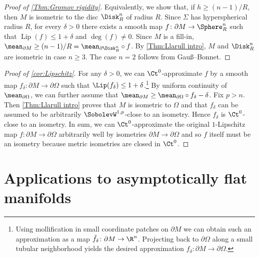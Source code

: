 \documentclass[a4paper,11pt]{amsart}
\numberwithin{equation}{section}
\begin{document}
\begin{proof}[Proof of \cref{Thm:Gromov rigidity}]
Equivalently, we show that, if $h\geq(n-1)/R$, then $M$ is isometric to the disc $\Disk_R^n$ of radius $R$.
Since $\Sigma$ has hyperspherical radius $R$, for every \(\delta > 0\) there exists a smooth map $f \colon\partial M\to\Sphere^n_R$ such that \(\operatorname{Lip}(f) \leq 1 + \delta\) and \(\deg(f) \neq 0\).
Since $M$ is a fill-in, \(\mean_{\partial M}\geq (n-1)/R=\mean_{\partial\Disk^n_R} \circ f\).
By \cref{Thm:Llarull intro}, $M$ and $\Disk^n_R$ are isometric in case $n\ge3$. The case $n=2$ follows from Gauß--Bonnet. 
\end{proof}

\begin{proof}[Proof of \cref{cor:Lipschitz}]
    For any \(\delta > 0\), we can \(\Ct^0\)-approximate \(f\) by a smooth map \(f_\delta \colon \partial M \to \partial \Omega\) such that \(\Lip(f_\delta) \leq 1 + \delta\).\footnote{Using mollification in small coordinate patches on \(\partial M\) we can obtain such an approximation as a map \(\tilde{f}_\delta \colon \partial M \to \R^n\). Projecting back to \(\partial \Omega\) along a small tubular neighborhood yields the desired approximation \(f_\delta \colon \partial M \to \partial \Omega\).}
    By uniform continuity of \(\mean_{\partial \Omega}\), we can further assume that \(\mean_{\partial M} \geq \mean_{\partial \Omega} \circ f_\delta - \delta\).
    Fix \(p > n\).
    Then \cref{Thm:Llarull intro} proves that \(M\) is isometric to \(\Omega\) and that \(f_\delta\) can be assumed to be arbitrarily \(\SobolevW^{1,p}\)-close to an isometry.
    Hence \(f_\delta\) is \(\Ct^0\)-close to an isometry.
    In sum, we can \(\Ct^0\)-approximate the original \(1\)-Lipschitz map \(f \colon \partial M \to \partial \Omega \) arbitrarily well by isometries \(\partial M \to \partial \Omega\) and so \(f\) itself must be an isometry because metric isometries are closed in \(\Ct^0\).
\end{proof}









\section{Applications to asymptotically flat manifolds}\label{S:PMT}
\end{document}
